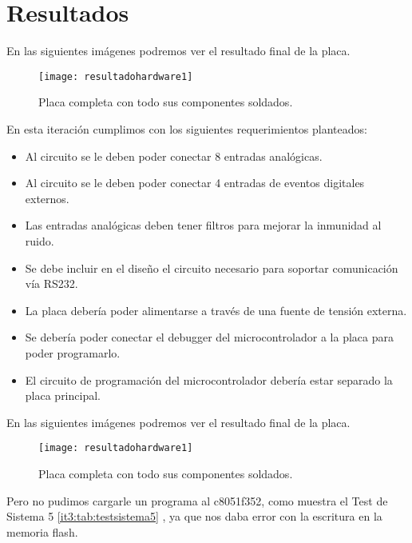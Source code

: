 
\section{Resultados} %
\label{it3:sec:resultados}
En las siguientes imágenes podremos ver el resultado final de la placa.

\begin{figure}[H]
  \centering
  \texttt{[image: resultadohardware1]}
  \caption{Placa completa con todo sus componentes soldados.}\label{fig:resultadohardware1}
\end{figure}

En esta iteración cumplimos con los siguientes requerimientos planteados:
\begin{itemize}
  \item Al circuito se le deben poder conectar 8 entradas analógicas.
  \item Al circuito se le deben poder conectar 4 entradas de eventos digitales externos.
  \item Las entradas analógicas deben tener filtros para mejorar la inmunidad al ruido.
  \item Se debe incluir en el diseño el circuito necesario para soportar comunicación vía RS232.
  \item La placa debería poder alimentarse a través de una fuente de tensión externa.
  \item Se debería poder conectar el debugger del microcontrolador a la placa para poder programarlo.
  \item El circuito de programación del microcontrolador debería estar separado la placa principal.
\end{itemize}

En las siguientes imágenes podremos ver el resultado final de la placa.

\begin{figure}[H]
  \centering
  \texttt{[image: resultadohardware1]}
  \caption{Placa completa con todo sus componentes soldados.}\label{fig:resultadohardware1}
\end{figure}

Pero no pudimos cargarle un programa al c8051f352, como muestra el Test de Sistema 5 \ref{it3:tab:testsistema5} , ya que nos daba error con la escritura en la memoria flash.

